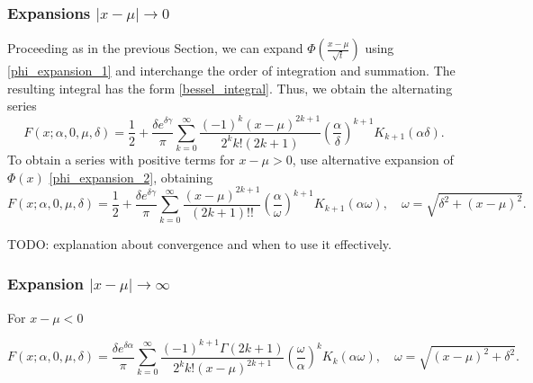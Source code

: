 \documentclass[10pt,a4paper,oneside]{article}
\numberwithin{equation}{section}
\begin{document}
\subsubsection{Expansions $|x-\mu| \to 0$}
Proceeding as in the previous Section, we can expand $\Phi\left(\frac{x-\mu}{\sqrt{t}}\right)$ using \eqref{phi_expansion_1} and interchange the order of integration and summation. The resulting integral has the form \eqref{bessel_integral}. Thus, we obtain the alternating series
\begin{equation}\label{expansion_xmu_b0_alternating}
F(x; \alpha, 0, \mu, \delta) = \frac{1}{2} + \frac{\delta e^{\delta \gamma}}{\pi}\sum_{k=0}^{\infty} \frac{(-1)^k (x-\mu)^{2k+1}}{2^k k! (2k + 1)} \left(\frac{\alpha}{\delta}\right)^{k+1}K_{k+1}(\alpha \delta).
\end{equation}
To obtain a series with positive terms for $x - \mu > 0$, use alternative expansion of $\Phi(x)$ \eqref{phi_expansion_2}, obtaining
\begin{equation}\label{expansion_xmu_b0_positive}
F(x; \alpha, 0, \mu, \delta) = \frac{1}{2} + \frac{\delta e^{\delta \gamma}} {\pi}\sum_{k=0}^{\infty} \frac{(x-\mu)^{2k+1}}{(2k +1)!!} \left(\frac{\alpha}{\omega}\right)^{k+1}K_{k+1}(\alpha \omega), \quad \omega = \sqrt{\delta^2 + (x-\mu)^2}.
\end{equation}

TODO: explanation about convergence and when to use it effectively.

\subsubsection{Expansion $|x-\mu| \to \infty$}
For $x - \mu < 0$

\begin{equation}
F(x; \alpha, 0, \mu, \delta) = \frac{\delta e^{\delta \alpha}}{\pi} \sum_{k=0}^{\infty}\frac{(-1)^{k+1}\Gamma(2k + 1)}{2^k k! (x-\mu)^{2k + 1}} \left(\frac{\omega}{\alpha}\right)^k K_k(\alpha \omega), \quad \omega = \sqrt{(x-\mu)^2 + \delta^2}.
\end{equation}
\end{document}
